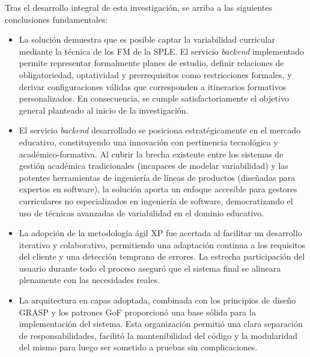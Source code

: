 \conclusions

Tras el desarrollo integral de esta investigación, se arriba a las siguientes conclusiones fundamentales:

\begin{itemize}
    \item La solución demuestra que es posible captar la variabilidad curricular mediante la 
    técnica de los \ac{FM} de la \ac{SPLE}. El servicio \textit{backend} implementado permite representar formalmente planes de estudio, 
    definir relaciones de obligatoriedad, optatividad y prerrequisitos como restricciones formales, y 
    derivar configuraciones válidas que corresponden a itinerarios formativos personalizados. 
    En consecuencia, se cumple satisfactoriamente el objetivo general planteado al inicio de la investigación.

    \item El servicio \textit{backend} desarrollado se posiciona estratégicamente en el mercado educativo, 
    constituyendo una innovación con pertinencia tecnológica y académico-formativa. Al cubrir la 
    brecha existente entre los sistemas de gestión académica tradicionales 
    (incapaces de modelar variabilidad) y las potentes herramientas de ingeniería de líneas de 
    productos (diseñadas para expertos en software), la solución aporta un enfoque accesible 
    para gestores curriculares no especializados en ingeniería de software, 
    democratizando el uso de técnicas avanzadas de variabilidad en el dominio educativo.
    
    \item La adopción de la metodología ágil \ac{XP} fue acertada al facilitar un desarrollo iterativo y colaborativo, 
    permitiendo una adaptación continua a los requisitos del cliente y una detección temprana de errores. 
    La estrecha participación del usuario durante todo el proceso aseguró que el sistema final se alineara 
    plenamente con las necesidades reales.

    \item La arquitectura en capas adoptada, combinada con los principios de diseño \ac{GRASP} y 
    los patrones \ac{GoF} proporcionó una base sólida para la implementación del sistema. 
    Esta organización permitió una clara separación de responsabilidades, facilitó la mantenibilidad 
    del código y la modularidad del mismo para luego ser sometido a pruebas sin complicaciones.
    

\end{itemize}
